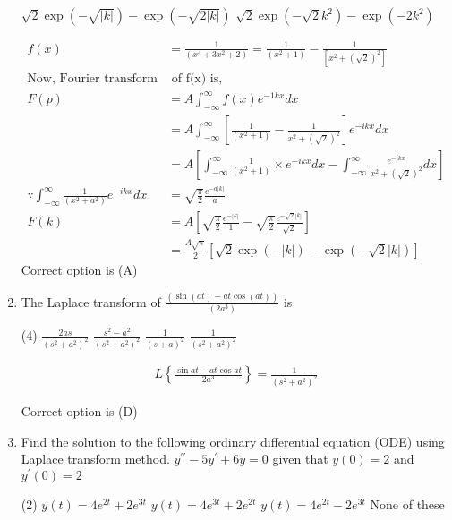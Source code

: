 \begin{enumerate}
\begin{tasks}
	\task[\textbf{c.}]$\sqrt{2} \exp (-\sqrt{|k|})-\exp (-\sqrt{2|k|})$
	\task[\textbf{d.}] $\sqrt{2} \exp \left(-\sqrt{2} k^{2}\right)-\exp \left(-2 k^{2}\right)$
\end{tasks}
\begin{answer}
	$$\begin{aligned}
	f(x)&=\frac{1}{\left(x^{4}+3 x^{2}+2\right)}=\frac{1}{\left(x^{2}+1\right)}-\frac{1}{\left[x^{2}+(\sqrt{2})^{2}\right]}\\
	\text{Now, Fourier transform}&\text{ of f(x) is,}\\
	F(p)&=A \int_{-\infty}^{\infty} f(x) e^{-1 k x} d x\\
	&=A \int_{-\infty}^{\infty}\left[\frac{1}{\left(x^{2}+1\right)}-\frac{1}{x^{2}+(\sqrt{2})^{2}}\right] e^{-i k x} d x\\&=A\left[\int_{-\infty}^{\infty} \frac{1}{\left(x^{2}+1\right)} \times e^{-i k x} d x-\int_{-\infty}^{\infty} \frac{e^{-i k x}}{x^{2}+(\sqrt{2})^{2}} d x\right]\\
	\because \int_{-\infty}^{\infty} \frac{1}{\left(x^{2}+a^{2}\right)} e^{-i k x} d x&=\sqrt{\frac{\pi}{2}} \frac{e^{-a|k|}}{a}\\
	F(k)&=A\left[\sqrt{\frac{\pi}{2}} \frac{e^{-|k|}}{1}-\sqrt{\frac{\pi}{2}} \frac{e^{-\sqrt{2}|k|}}{\sqrt{2}}\right]\\&=\frac{A \sqrt{\pi}}{2}[\sqrt{2} \exp (-|k|)-\exp (-\sqrt{2}|k|)]
	\end{aligned}$$
	Correct option is (A)
\end{answer}
\item The Laplace transform of $\frac{(\sin (a t)-a t \cos (a t))}{\left(2 a^{3}\right)}$ is
\begin{tasks}(4)
	\task[\textbf{a.}]$\frac{2 a s}{\left(s^{2}+a^{2}\right)^{2}}$
	\task[\textbf{b.}]$\frac{s^{2}-a^{2}}{\left(s^{2}+a^{2}\right)^{2}}$
	\task[\textbf{c.}] $\frac{1}{(s+a)^{2}}$
	\task[\textbf{d.}] $\frac{1}{\left(s^{2}+a^{2}\right)^{2}}$
\end{tasks}
\begin{answer}
	$$\begin{aligned}
	L\left\{\frac{\sin a t-a t \cos a t}{2 a^{3}}\right\}=\frac{1}{\left(s^{2}+a^{2}\right)^{2}}
	\end{aligned}$$
	
	Correct option is (D)
\end{answer}
\item Find the solution to the following ordinary differential equation (ODE) using Laplace transform method.
$y^{\prime \prime}-5 y^{\prime}+6 y=0$ given that $y(0)=2$ and $y^{\prime}(0)=2$
\begin{tasks}(2)
	\task[\textbf{a.}] $y(t)=4 e^{2 t}+2 e^{3 t}$
	\task[\textbf{b.}]$y(t)=4 e^{3 t}+2 e^{2 t}$
	\task[\textbf{c.}]$y(t)=4 e^{2 t}-2 e^{3 t}$
	\task[\textbf{d.}] None of these 
\end{tasks}


\end{enumerate}
